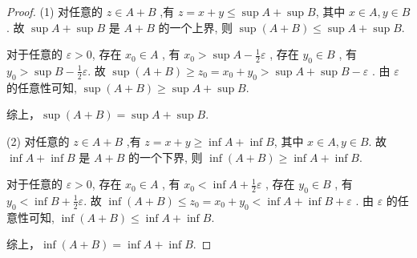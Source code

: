 \begin{proof}
    (1) \biyao 对任意的 $z\in A+B$ ,有 $z=x+y \le \sup A + \sup B $, 其中 $x\in A,y\in B$. 故 $\sup A + \sup B$ 是 $A+B$ 的一个上界, 则 $\sup (A+B)\le \sup A + \sup B$.
    
    \chongfen 
    对于任意的 $\varepsilon>0$, 存在 $x_0\in A$ , 有 $x_0>\sup A - \frac{1}{2}\varepsilon$ , 存在 $y_0\in B$ , 有 $y_0>\sup B - \frac{1}{2}\varepsilon$. 故 $\sup(A+B) \ge z_0 = x_0+y_0>\sup A+\sup B -\varepsilon$ . 由 $\varepsilon$ 的任意性可知, $\sup(A+B) \ge \sup A+\sup B $.
    
    综上，$\sup(A+B) = \sup A+\sup B $.
    
    (2) \biyao 对任意的 $z\in A+B$ ,有 $z=x+y \ge \inf A + \inf B $, 其中 $x\in A,y\in B$. 故 $\inf A + \inf B$ 是 $A+B$ 的一个下界, 则 $\inf (A+B)\ge \inf A + \inf B$.
    
    \chongfen 
    对于任意的 $\varepsilon>0$, 存在 $x_0\in A$ , 有 $x_0<\inf A + \frac{1}{2}\varepsilon$ , 存在 $y_0\in B$ , 有 $y_0<\inf B + \frac{1}{2}\varepsilon$. 故 $\inf(A+B) \le z_0 = x_0+y_0<\inf A+\inf B +\varepsilon$ . 由 $\varepsilon$ 的任意性可知, $\inf(A+B) \le \inf A+\inf B $.
    
    综上，$\inf(A+B) = \inf A+\inf B $.
\end{proof}

\newsection